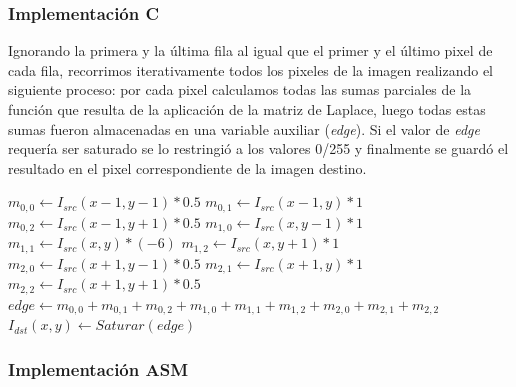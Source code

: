 \subsubsection{Implementación C}

Ignorando la primera y la última fila al igual que el primer y el último pixel de cada fila, recorrimos iterativamente todos los pixeles de la imagen realizando el siguiente proceso: por cada pixel calculamos todas las sumas parciales de la función que resulta de la aplicación de la matriz de Laplace, luego todas estas sumas fueron almacenadas en una variable auxiliar (\textit{edge}). Si el valor de \textit{edge} requería ser saturado se lo restringió a los valores 0/255 y finalmente se guardó el resultado en el pixel correspondiente de la imagen destino.

\begin{algorithm}[H]
  \begin{algorithmic}[1]
			  \STATE $m_{0,0} \gets I_{src}(x-1,y-1)*0.5$
			  \STATE $m_{0,1} \gets I_{src}(x-1,y)*1$
			  \STATE $m_{0,2} \gets I_{src}(x-1,y+1)*0.5$
			  \STATE $m_{1,0} \gets I_{src}(x,y-1)*1$
			  \STATE $m_{1,1} \gets I_{src}(x,y)*(-6)$
			  \STATE $m_{1,2} \gets I_{src}(x,y+1)*1$
			  \STATE $m_{2,0} \gets I_{src}(x+1,y-1)*0.5$
			  \STATE $m_{2,1} \gets I_{src}(x+1,y)*1$
			  \STATE $m_{2,2} \gets I_{src}(x+1,y+1)*0.5$
			  \STATE $edge \gets m_{0,0}+m_{0,1}+m_{0,2}+m_{1,0}+m_{1,1}+m_{1,2}+m_{2,0}+m_{2,1}+m_{2,2}$
			  \STATE $I_{dst}(x,y) \gets Saturar(edge)$
			\ENDFOR
		 \ENDFOR
  \end{algorithmic}
  \caption{$edge (I_{src}, I_{dst})$}
  \label{alg:edge}
\end{algorithm}

\subsubsection{Implementación ASM}